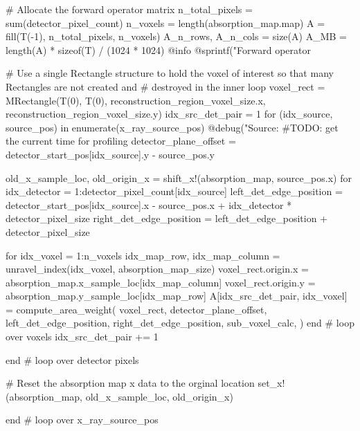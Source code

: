 \documentclass[11pt,letterpaper]{article}
\author{Rick Gaudette}
\begin{document}
    # Allocate the forward operator matrix
    n_total_pixels = sum(detector_pixel_count)
    n_voxels = length(absorption_map.map)
    A = fill(T(-1), n_total_pixels, n_voxels)
    A_n_rows, A_n_cols = size(A)
    A_MB = length(A) * sizeof(T) / (1024 * 1024)
    @info @sprintf("Forward operator %

    # Use a single Rectangle structure to hold the voxel of interest so that many Rectangles are not created and
    # destroyed in the inner loop
    voxel_rect = MRectangle(T(0), T(0), reconstruction_region_voxel_size.x, reconstruction_region_voxel_size.y)
    idx_src_det_pair = 1
    for (idx_source, source_pos) in enumerate(x_ray_source_pos)
        @debug("Source: %
        #TODO: get the current time for profiling
        detector_plane_offset = detector_start_pos[idx_source].y - source_pos.y

        old_x_sample_loc, old_origin_x = shift_x!(absorption_map, source_pos.x)
        for idx_detector = 1:detector_pixel_count[idx_source]
            left_det_edge_position =
                detector_start_pos[idx_source].x - source_pos.x + idx_detector * detector_pixel_size
            right_det_edge_position = left_det_edge_position + detector_pixel_size

            for idx_voxel = 1:n_voxels
                idx_map_row, idx_map_column = unravel_index(idx_voxel, absorption_map_size)
                voxel_rect.origin.x = absorption_map.x_sample_loc[idx_map_column]
                voxel_rect.origin.y = absorption_map.y_sample_loc[idx_map_row]
                A[idx_src_det_pair, idx_voxel] = compute_area_weight(
                    voxel_rect,
                    detector_plane_offset,
                    left_det_edge_position,
                    right_det_edge_position,
                    sub_voxel_calc,
                )
            end  # loop over voxels
            idx_src_det_pair += 1

        end  # loop over detector pixels

        # Reset the absorption map x data to the orginal location
        set_x!(absorption_map, old_x_sample_loc, old_origin_x)

    end  # loop over x_ray_source_pos
    
\end{document}
